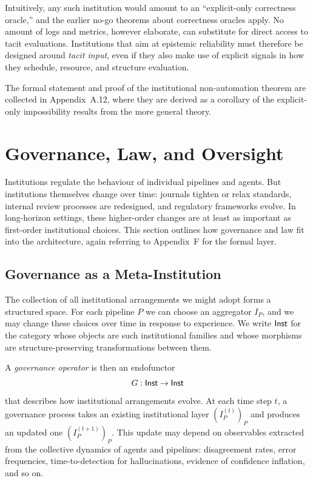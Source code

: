 Intuitively, any such institution would amount to an ``explicit-only correctness oracle,'' and the earlier no-go theorems about correctness oracles apply. No amount of logs and metrics, however elaborate, can substitute for direct access to tacit evaluations. Institutions that aim at epistemic reliability must therefore be designed around \emph{tacit input}, even if they also make use of explicit signals in how they schedule, resource, and structure evaluation.

The formal statement and proof of the institutional non-automation theorem are collected in Appendix~A.12, where they are derived as a corollary of the explicit-only impossibility results from the more general theory.

\section{Governance, Law, and Oversight}
\label{sec:governance-main}

Institutions regulate the behaviour of individual pipelines and agents. But institutions themselves change over time: journals tighten or relax standards, internal review processes are redesigned, and regulatory frameworks evolve. In long-horizon settings, these higher-order changes are at least as important as first-order institutional choices. This section outlines how governance and law fit into the architecture, again referring to Appendix~F for the formal layer.

\subsection{Governance as a Meta-Institution}

The collection of all institutional arrangements we might adopt forms a structured space. For each pipeline $P$ we can choose an aggregator $I_P$, and we may change these choices over time in response to experience. We write $\mathsf{Inst}$ for the category whose objects are such institutional families and whose morphisms are structure-preserving transformations between them.

A \emph{governance operator} is then an endofunctor
\[
  G : \mathsf{Inst} \to \mathsf{Inst}
\]
that describes how institutional arrangements evolve. At each time step $t$, a governance process takes an existing institutional layer $(I^{(t)}_P)_P$ and produces an updated one $(I^{(t+1)}_P)_P$. This update may depend on observables extracted from the collective dynamics of agents and pipelines: disagreement rates, error frequencies, time-to-detection for hallucinations, evidence of confidence inflation, and so on.

